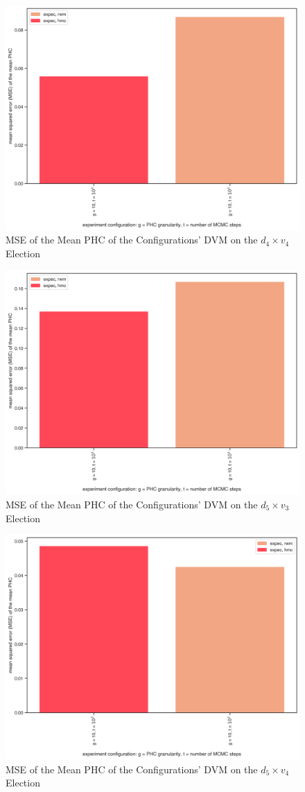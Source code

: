 \begin{figure}[ht]\centering
 \includegraphics[width=0.75\linewidth]{figures/4_4_mean_mse.png}
 \caption{MSE of the Mean PHC of the Configurations' DVM on the $d_4 \times v_4$ Election}
 \label{fig:4_4_mean_mse_append}
\end{figure}

\begin{figure}[ht]\centering
 \includegraphics[width=0.75\linewidth]{figures/5_3_mean_mse.png}
 \caption{MSE of the Mean PHC of the Configurations' DVM on the $d_5 \times v_3$ Election}
 \label{fig:5_3_mean_mse}
\end{figure}

\begin{figure}[ht]\centering
 \includegraphics[width=0.75\linewidth]{figures/5_4_mean_mse.png}
 \caption{MSE of the Mean PHC of the Configurations' DVM on the $d_5 \times v_4$ Election}
 \label{fig:5_4_mean_mse}
\end{figure}

